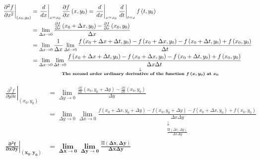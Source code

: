 \begin{align*}
    \left.\frac{\partial^2f}{\partial x^2}\right|_{\left(x_0,y_0\right)} & =\left.\frac{d}{dx}\right|_{x=x_0}\frac{\partial f}{\partial x}\left(x,y_0\right)=\left.\frac{d}{dx}\right|_{x=x_0}\left.\frac{d}{dt}\right|_{t=x}f\left(t,y_0\right)                                   \\
                                                                         & =\lim_{\Delta x\to 0}\frac{\frac{\partial f}{\partial x}\left(x_0+\Delta x,y_0\right)-\frac{\partial f}{\partial x}\left(x_0,y_0\right)}{\Delta x}                                                      \\
                                                                         & =\lim_{\Delta x\to 0}\frac{1}{\Delta x}\lim_{\Delta t\to 0}\frac{f\left(x_0+\Delta x+\Delta t,y_0\right)-f\left(x_0+\Delta x,y_0\right)-f\left(x_0+\Delta t,y_0\right)+f\left(x_0,y_0\right)}{\Delta t} \\
                                                                         & =\underset{\substack{\downarrow                                                                                                                                                                         \\\text{ \textbf{\boldmath The second order ordinary derivative of the function $f\left(x,y_0\right)$ at $x_0$} }}}{\lim_{\Delta x\to 0}\lim_{\Delta t\to 0}\frac{f\left(x_0+\Delta x+\Delta t,y_0\right)-f\left(x_0+\Delta x,y_0\right)-f\left(x_0+\Delta t,y_0\right)+f\left(x_0,y_0\right)}{\Delta x\Delta t}}
\end{align*}

\begin{align*}
    \left.\frac{\partial^2f}{\partial y\partial x}\right|_{\left(x_0,y_0\right)}              & =\lim_{\Delta y\to 0}\frac{\frac{\partial f}{\partial x}\left(x_0,y_0+\Delta y\right)-\frac{\partial f}{\partial x}\left(x_0,y_0\right)}{\Delta y} \\
                                                                                              & =\lim_{\Delta y\to 0}\lim_{\Delta x\to 0}\underset{\substack{\downarrow                                                                            \\\frac{\mathrm{II}(\Delta x,\Delta y)}{\Delta x\Delta y}}}{\frac{f\left(x_0+\Delta x,y_0+\Delta y\right)-f\left(x_0,y_0+\Delta y\right)-f\left(x_0+\Delta x,y_0\right)+f\left(x_0,y_0\right)}{\Delta x\Delta y}}\\
    \boldsymbol{\left.\frac{\partial^2f}{\partial x\partial y}\right|_{\left(x_0,y_0\right)}} & \boldsymbol{=\lim_{\Delta x\to 0}\lim_{\Delta y\to 0}\frac{\mathrm{II}(\Delta x,\Delta y)}{\Delta x\Delta y}}
\end{align*}

